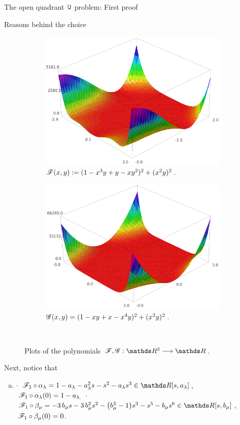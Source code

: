 \documentclass[11pt, a4paper, english, twoside, notitlepage, openright]{report}
\begin{document}
\begin{chapter}{The open quadrant $\mathcal{Q}$ problem: First proof}
\begin{section}{Reasons behind the choice}
\begin{figure}[h]\hspace{-0.15cm}
\begin{subfigure}{.50\linewidth}\centering
\includegraphics[width=1\textwidth]{plots/ch1_04_F.png}
\caption{$\mathscr{F}(x,y):=(1-x^3y+y-xy^2)^2+(x^2y)^2$.\label{fig:F}}
\end{subfigure}
\begin{subfigure}{.50\linewidth}\centering
\includegraphics[width=1\textwidth]{plots/ch1_05_G.png}
\caption{$\mathscr{G}(x,y)=(1-xy+x-x^4y)^2+(x^2y)^2$.\label{fig:G}}
\end{subfigure}\\[1ex]
\caption{Plots of the polynomials $\F,\G:\R^2\longrightarrow\R$.\label{fig:plotFG}}
\end{figure}
Next, notice that
\begin{enumerate}[(a)]
\item $\cdot$ $\F_1\circ\alpha_\lambda=1-a_{\lambda}-a_{\lambda}^{2} s-s^{2}-a_{\lambda} s^{3}\in\R[s,a_{\lambda}]$,
$\, \mathscr{F}_1\circ\alpha_{\lambda }(0)=1-a_{\lambda. }$ \newline
$\cdot$ $\F_1\circ\beta_{\mu}=-3\,b_{\mu}s-3 \,b_{\mu}^{2} s^{2}-{\left(b_{\mu}^{3}-1\right)}s^{3}-s^{5}-b_{\mu}s^{6}\in\R[s,b_{\mu}]$,
$\, \mathscr{F}_1\circ\beta_{\mu}(0)=0$.
				

\end{enumerate}
\end{section}
\end{chapter}
\end{document}
